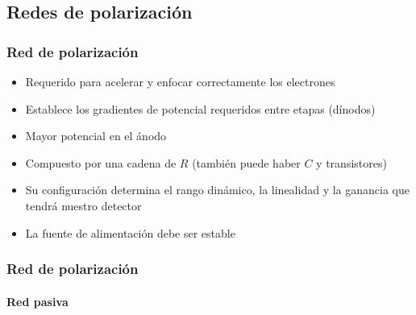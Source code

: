 \documentclass{beamer}
\begin{document}
\subsection{Redes de polarización}

\begin{frame}
\frametitle{Red de polarización}
\begin{itemize}
\item Requerido para acelerar y enfocar correctamente los electrones
\item Establece los gradientes de potencial requeridos entre etapas (dínodos) 
\item {\color{blue}Mayor potencial en el ánodo}
\item Compuesto por una cadena de $R$ (también puede haber $C$ y transistores)
\item {\color{blue}Su configuración determina el rango dinámico, la linealidad y la ganancia
que tendrá nuestro detector}
\item La fuente de alimentación debe ser estable
\end{itemize}
\begin{center}
\end{center}
\end{frame}

\begin{frame}
\frametitle{Red de polarización}
\framesubtitle{Red pasiva}
\end{frame}
\end{document}
